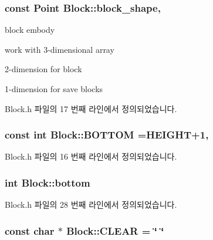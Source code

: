 \subsubsection[{\texorpdfstring{block\+\_\+shape}{block_shape}}]{\setlength{\rightskip}{0pt plus 5cm}const {\bf Point} Block\+::block\+\_\+shape\hspace{0.3cm}{\ttfamily [static]}, {\ttfamily [private]}}\hypertarget{class_block_a87730d80e01cf50689abc8525d27f06d}{}\label{class_block_a87730d80e01cf50689abc8525d27f06d}


block embody 

work with 3-\/dimensional array

2-\/dimension for block

1-\/dimension for save blocks 

Block.\+h 파일의 17 번째 라인에서 정의되었습니다.

\subsubsection[{\texorpdfstring{B\+O\+T\+T\+OM}{BOTTOM}}]{\setlength{\rightskip}{0pt plus 5cm}const int Block\+::\+B\+O\+T\+T\+OM ={\bf H\+E\+I\+G\+HT}+1\hspace{0.3cm}{\ttfamily [static]}, {\ttfamily [private]}}\hypertarget{class_block_acae0f4fec218b09fc2ea00e6fa97f9a5}{}\label{class_block_acae0f4fec218b09fc2ea00e6fa97f9a5}


Block.\+h 파일의 16 번째 라인에서 정의되었습니다.

\subsubsection[{\texorpdfstring{bottom}{bottom}}]{\setlength{\rightskip}{0pt plus 5cm}int Block\+::bottom}\hypertarget{class_block_a8d97d8b0b6a09592ac007c13c3fa3867}{}\label{class_block_a8d97d8b0b6a09592ac007c13c3fa3867}


Block.\+h 파일의 28 번째 라인에서 정의되었습니다.

\subsubsection[{\texorpdfstring{C\+L\+E\+AR}{CLEAR}}]{\setlength{\rightskip}{0pt plus 5cm}const char $\ast$ Block\+::\+C\+L\+E\+AR = \char`\"{} \char`\"{}\hspace{0.3cm}{\ttfamily [static]}}\hypertarget{class_block_a11bcda9589b54be35a8905ca7be7310e}{}\label{class_block_a11bcda9589b54be35a8905ca7be7310e}


